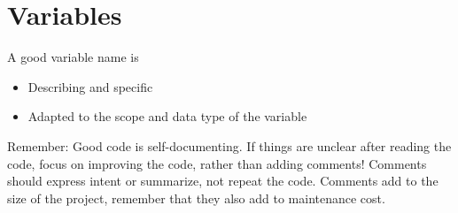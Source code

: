 \section{Variables}
A good variable name is
\begin{itemize}
    \item Describing and specific
    \item Adapted to the scope and data type of the variable
\end{itemize}
Remember: Good code is self-documenting. If things are unclear after reading the code, focus on improving the code, rather than adding comments! Comments should express intent or summarize, not repeat the code. Comments add to the size of the project, remember that they also add to maintenance cost.


